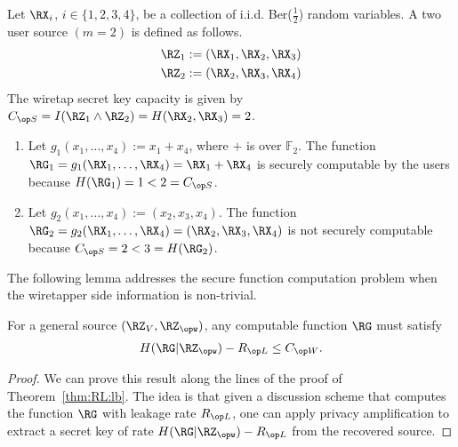 {\begin{example}
Let $\RX_i$,  $i \in \{1,2,3,4\}$, be a collection of i.i.d. Ber($\frac{1}{2}$) random variables. A two user source $(m=2)$ is defined as follows.  
\begin{align*}
    \RZ_1&:=(\RX_1,\RX_2,\RX_3)\\
    \RZ_2&:=(\RX_2,\RX_3,\RX_4)
\end{align*}
The wiretap secret key capacity is given by $   \skc=I(\RZ_1 \wedge \RZ_2) = H(\RX_2,\RX_3)=2$.
\begin{enumerate}[label=\alph*)]
    \item Let $g_1(x_1,\ldots,x_4):=x_1+x_4$, where $+$ is over $\mathbb{F}_2$. The function $\RG_1=g_1(\RX_1,\ldots,\RX_4)=\RX_1+\RX_4$ is securely computable by the users because $H(\RG_1)=1 < 2=\skc$.
    \item Let $g_2(x_1,\ldots,x_4):=(x_2, x_3, x_4)$. The function $\RG_2=g_2(\RX_1,\ldots,\RX_4)=(\RX_2, \RX_3, \RX_4)$ is not securely computable because $\skc=2<3=H(\RG_2)$.
\end{enumerate}
\end{example}

The following lemma addresses the secure function computation problem when the wiretapper side information is non-trivial.


\begin{lemma}\label{thm:func:necessary}
For a general source $(\RZ_V,\RZ_{\opw})$, any computable function $\RG$ must satisfy 
\begin{align}\label{eq:func_comp:lb}
    H(\RG|\RZ_{\opw})-\rl \leq \wskc.
\end{align}    
\end{lemma}
\begin{proof} We can  prove this result along the lines of the proof of Theorem~\ref{thm:RL:lb}. The idea is that given a discussion scheme that computes the function $\RG$ with leakage rate $\rl$, one can apply privacy amplification to extract a secret key of rate $H(\RG|\RZ_{\opw})-\rl$ from the recovered source.
\end{proof}

}
